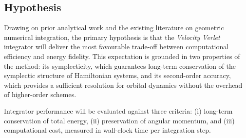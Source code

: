 \subsection{Hypothesis}

Drawing on prior analytical work and the existing literature on geometric numerical integration, the primary hypothesis
is that the \textit{Velocity Verlet} integrator will deliver the most favourable trade-off between computational
efficiency and energy fidelity.
This expectation is grounded in two properties of the method: its symplecticity, which guarantees long-term conservation
of the symplectic structure of Hamiltonian systems, and its second-order accuracy, which provides a sufficient
resolution for orbital dynamics without the overhead of higher-order schemes.

Integrator performance will be evaluated against three criteria: (i) long-term conservation of total energy, (ii)
preservation of angular momentum, and (iii) computational cost, measured in wall-clock time per integration step.